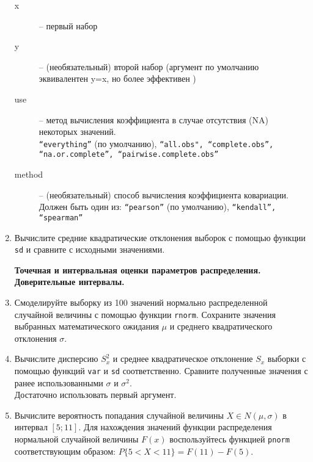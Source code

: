 \begin{enumerate}
\begin{mdframed}[style=BadassFrame]
\begin{description}
                \item[x] -- первый набор
                \item[y] -- (необязательный) второй набор (аргумент по умолчанию эквивалентен y=x, но более эффективен )
                \item[use] -- метод вычисления коэффициента в случае отсутствия (NA) некоторых значений. \\
                     \texttt{``everything''} (по умолчанию),  \texttt{``all.obs", ``complete.obs'', ``na.or.complete'', ``pairwise.complete.obs''}
                \item[method] -- (необязательный) способ вычисления коэффициента ковариации. Должен быть один из: 
                     \texttt{``pearson''} (по умолчанию), \texttt{``kendall'', ``spearman''}
              \end{description}
          \end{mdframed}

    \item Вычислите средние квадратические отклонения выборок с помощью функции \texttt{sd} и сравните
          с исходными значениями.


    \textbf{Точечная и интервальная оценки параметров распределения. Доверительные интервалы.}

    \item Смоделируйте выборку из 100 значений нормально распределенной случайной величины с помощью
          функции \texttt{rnorm}. Сохраните значения выбранных математического ожидания $\mu$ и 
          среднего квадратического отклонения $\sigma$.

    \item Вычислите дисперсию $S_x^2$ и среднее квадратическое отклонение $S_x$ выборки с помощью 
          функций \texttt{var} и \texttt{sd} соответственно. Сравните полученные значения с ранее использованными 
          $\sigma$ и $\sigma^2$. \\
          Достаточно использовать первый аргумент.

    \item Вычислите вероятность попадания случайной величины $X \in N(\mu, \sigma)$ в интервал $[5;11]$. Для нахождения значений функции распределения
          нормальной случайной величины $F(x)$ воспользуйтесь функцией \texttt{pnorm} соответствующим образом: $P\{5<X<11\}=F(11)-F(5)$.

          \begin{mdframed}[style=BadassFrame]


\end{mdframed}
\end{enumerate}
